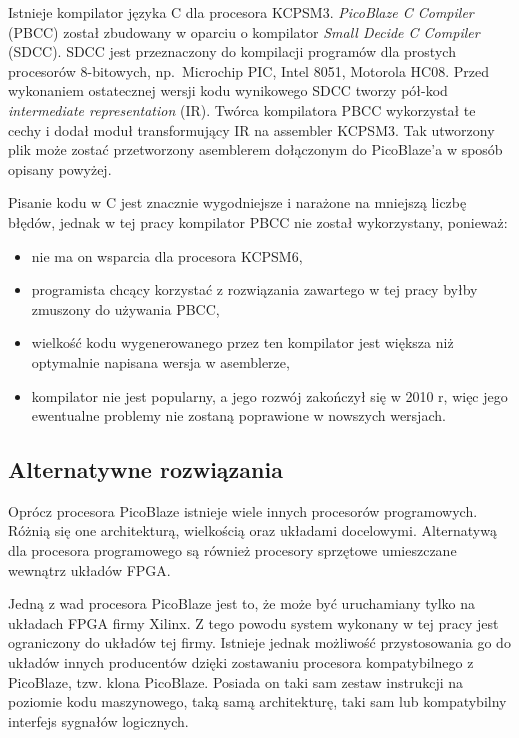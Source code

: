 Istnieje kompilator języka C dla procesora KCPSM3. \textit{PicoBlaze C Compiler} (PBCC) został zbudowany w oparciu o kompilator \textit{Small Decide C Compiler} (SDCC). SDCC jest przeznaczony do kompilacji programów dla prostych procesorów 8-bitowych, np.~Microchip PIC, Intel 8051, Motorola HC08. Przed wykonaniem ostatecznej wersji kodu wynikowego SDCC tworzy pół-kod \textit{intermediate representation} (IR). Twórca kompilatora PBCC wykorzystał te cechy i dodał moduł transformujący IR na assembler KCPSM3. Tak utworzony plik może zostać przetworzony asemblerem dołączonym do PicoBlaze'a w sposób opisany powyżej. \cite{pbcc}


Pisanie kodu w C jest znacznie wygodniejsze i narażone na mniejszą liczbę błędów, jednak w tej pracy kompilator PBCC nie został wykorzystany, ponieważ:


\begin{itemize}
	\item		nie ma on wsparcia dla procesora KCPSM6,
	\item		programista chcący korzystać z rozwiązania zawartego w tej pracy byłby zmuszony do używania PBCC,
	\item		wielkość kodu wygenerowanego przez ten kompilator jest większa niż optymalnie napisana wersja w asemblerze,
	\item		kompilator nie jest popularny, a jego rozwój zakończył się w 2010 r, więc jego ewentualne problemy nie zostaną poprawione w nowszych wersjach.
\end{itemize}


\subsection{Alternatywne rozwiązania}


Oprócz procesora PicoBlaze istnieje wiele innych procesorów programowych. Różnią się one architekturą, wielkością oraz układami docelowymi. Alternatywą dla procesora programowego są również procesory sprzętowe umieszczane wewnątrz układów FPGA.


Jedną z wad procesora PicoBlaze jest to, że może być uruchamiany tylko na układach FPGA firmy Xilinx. Z tego powodu system wykonany w tej pracy jest ograniczony do układów tej firmy. Istnieje jednak możliwość przystosowania go do układów innych producentów dzięki zostawaniu procesora kompatybilnego z PicoBlaze, tzw. klona PicoBlaze. Posiada on taki sam zestaw instrukcji na poziomie kodu maszynowego, taką samą architekturę, taki sam lub kompatybilny interfejs sygnałów logicznych.


